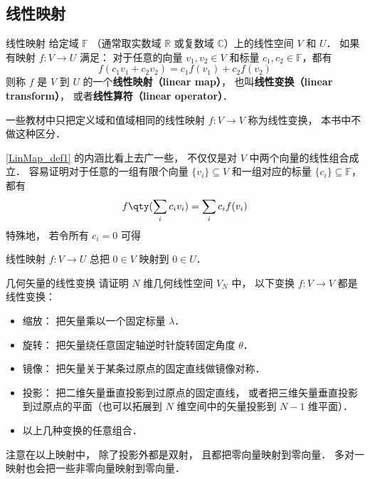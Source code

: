 
\begin{issues}
\end{issues}



\subsection{线性映射}
\begin{definition}{线性映射}\label{LinMap_def1}
给定域 $\mathbb F$ （通常取实数域 $\mathbb R$ 或复数域 $\mathbb C$）上的线性空间 $V$ 和 $U$． 如果有映射 $f:V\rightarrow U$ 满足： 对于任意的向量 ${v}_1, {v}_2\in V$ 和标量 $c_1, c_2 \in \mathbb{F}$，都有
\begin{equation}
f(c_1 {v}_1+c_2 {v}_2)=c_1f({v}_1)+c_2f({v}_2)
\end{equation}
则称 $f$ 是 $V$ 到 $U$ 的一个\textbf{线性映射（linear map）}， 也叫\textbf{线性变换（linear transform）}， 或者\textbf{线性算符（linear operator）}．
\end{definition}
一些教材中只把定义域和值域相同的线性映射 $f:V\to V$ 称为线性变换， 本书中不做这种区分．

\autoref{LinMap_def1} 的内涵比看上去广一些， 不仅仅是对 $V$ 中两个向量的线性组合成立． 容易证明对于任意的一组有限个向量 $\{{v}_i\}\subseteq V$ 和一组对应的标量 $\{c_i\}\subseteq\mathbb{F}$，都有
\begin{equation}\label{LinMap_eq1}
f\qty(\sum_i c_i {v}_i)=\sum_i c_i f({v}_i)
\end{equation}
特殊地， 若令所有 $c_i = 0$ 可得
\begin{corollary}{}\label{LinMap_cor1}
线性映射 $f:V\to U$ 总把 $0 \in V$ 映射到 $0 \in U$．
\end{corollary}

\begin{exercise}{几何矢量的线性变换}
请证明 $N$ 维几何线性空间 $V_N$ 中， 以下变换 $f:V\to V$ 都是线性变换：
\begin{itemize}
\item 缩放： 把矢量乘以一个固定标量 $\lambda$．
\item 旋转： 把矢量绕任意固定轴逆时针旋转固定角度 $\theta$．
\item 镜像： 把矢量关于某条过原点的固定直线做镜像对称．
\item 投影： 把二维矢量垂直投影到过原点的固定直线， 或者把三维矢量垂直投影到过原点的平面（也可以拓展到 $N$ 维空间中的矢量投影到 $N-1$ 维平面）．
\item 以上几种变换的任意组合．
\end{itemize}
\end{exercise}
注意在以上映射中， 除了投影外都是双射， 且都把零向量映射到零向量． 多对一映射也会把一些非零向量映射到零向量．

